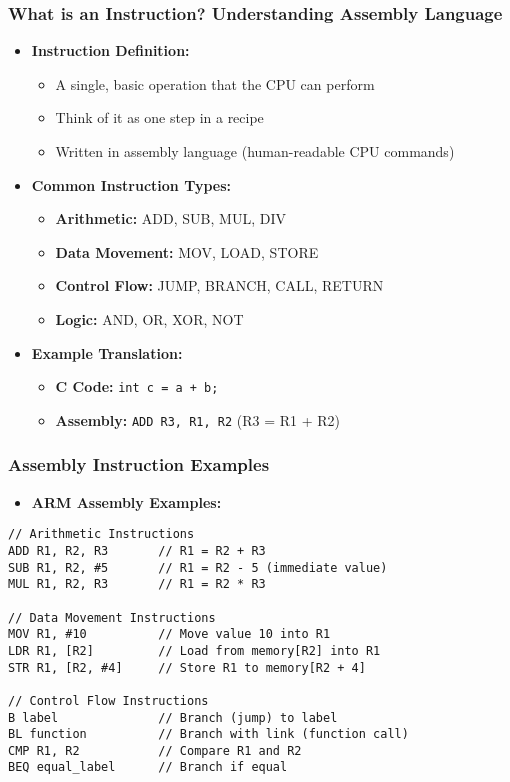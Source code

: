 \begin{frame}
\frametitle{What is an Instruction? Understanding Assembly Language}
\begin{itemize}
    \item \textbf{Instruction Definition:}
    \begin{itemize}
        \item A single, basic operation that the CPU can perform
        \item Think of it as one step in a recipe
        \item Written in assembly language (human-readable CPU commands)
    \end{itemize}
    \item \textbf{Common Instruction Types:}
    \begin{itemize}
        \item \textbf{Arithmetic:} ADD, SUB, MUL, DIV
        \item \textbf{Data Movement:} MOV, LOAD, STORE
        \item \textbf{Control Flow:} JUMP, BRANCH, CALL, RETURN
        \item \textbf{Logic:} AND, OR, XOR, NOT
    \end{itemize}
    \item \textbf{Example Translation:}
    \begin{itemize}
        \item \textbf{C Code:} \texttt{int c = a + b;}
        \item \textbf{Assembly:} \texttt{ADD R3, R1, R2} (R3 = R1 + R2)
    \end{itemize}
\end{itemize}
\end{frame}

\begin{frame}[fragile]
\frametitle{Assembly Instruction Examples}
\begin{itemize}
    \item \textbf{ARM Assembly Examples:}
\end{itemize}
\begin{verbatim}
// Arithmetic Instructions
ADD R1, R2, R3       // R1 = R2 + R3
SUB R1, R2, #5       // R1 = R2 - 5 (immediate value)
MUL R1, R2, R3       // R1 = R2 * R3

// Data Movement Instructions  
MOV R1, #10          // Move value 10 into R1
LDR R1, [R2]         // Load from memory[R2] into R1
STR R1, [R2, #4]     // Store R1 to memory[R2 + 4]

// Control Flow Instructions
B label              // Branch (jump) to label
BL function          // Branch with link (function call)
CMP R1, R2           // Compare R1 and R2
BEQ equal_label      // Branch if equal
\end{verbatim}
\end{frame}

